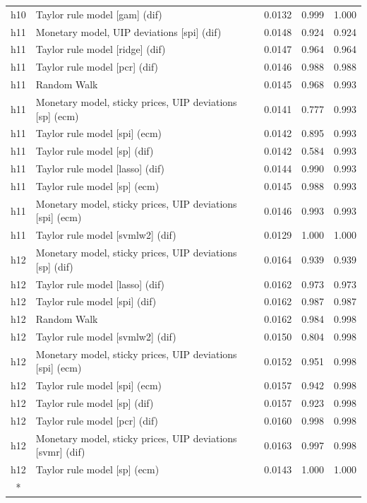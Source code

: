 \begin{ThreePartTable}
\begin{longtable}[t]{cp{5.5cm}ccc}
h10 & \raggedright Taylor rule model [gam] (dif) & 0.0132 & 0.999 & 1.000\\
\addlinespace
h11 & \raggedright Monetary model, UIP deviations [spi] (dif) & 0.0148 & 0.924 & 0.924\\
h11 & \raggedright Taylor rule model [ridge] (dif) & 0.0147 & 0.964 & 0.964\\
h11 & \raggedright Taylor rule model [pcr] (dif) & 0.0146 & 0.988 & 0.988\\
h11 & \raggedright Random Walk & 0.0145 & 0.968 & 0.993\\
h11 & \raggedright Monetary model, sticky prices, UIP deviations [sp] (ecm) & 0.0141 & 0.777 & 0.993\\
h11 & \raggedright Taylor rule model [spi] (ecm) & 0.0142 & 0.895 & 0.993\\
h11 & \raggedright Taylor rule model [sp] (dif) & 0.0142 & 0.584 & 0.993\\
h11 & \raggedright Taylor rule model [lasso] (dif) & 0.0144 & 0.990 & 0.993\\
h11 & \raggedright Taylor rule model [sp] (ecm) & 0.0145 & 0.988 & 0.993\\
h11 & \raggedright Monetary model, sticky prices, UIP deviations [spi] (ecm) & 0.0146 & 0.993 & 0.993\\
h11 & \raggedright Taylor rule model [svmlw2] (dif) & 0.0129 & 1.000 & 1.000\\
\addlinespace
h12 & \raggedright Monetary model, sticky prices, UIP deviations [sp] (dif) & 0.0164 & 0.939 & 0.939\\
h12 & \raggedright Taylor rule model [lasso] (dif) & 0.0162 & 0.973 & 0.973\\
h12 & \raggedright Taylor rule model [spi] (dif) & 0.0162 & 0.987 & 0.987\\
h12 & \raggedright Random Walk & 0.0162 & 0.984 & 0.998\\
h12 & \raggedright Taylor rule model [svmlw2] (dif) & 0.0150 & 0.804 & 0.998\\
h12 & \raggedright Monetary model, sticky prices, UIP deviations [spi] (ecm) & 0.0152 & 0.951 & 0.998\\
h12 & \raggedright Taylor rule model [spi] (ecm) & 0.0157 & 0.942 & 0.998\\
h12 & \raggedright Taylor rule model [sp] (dif) & 0.0157 & 0.923 & 0.998\\
h12 & \raggedright Taylor rule model [pcr] (dif) & 0.0160 & 0.998 & 0.998\\
h12 & \raggedright Monetary model, sticky prices, UIP deviations [svmr] (dif) & 0.0163 & 0.997 & 0.998\\
h12 & \raggedright Taylor rule model [sp] (ecm) & 0.0143 & 1.000 & 1.000\\*
\end{longtable}
\end{ThreePartTable}
\endgroup{}
